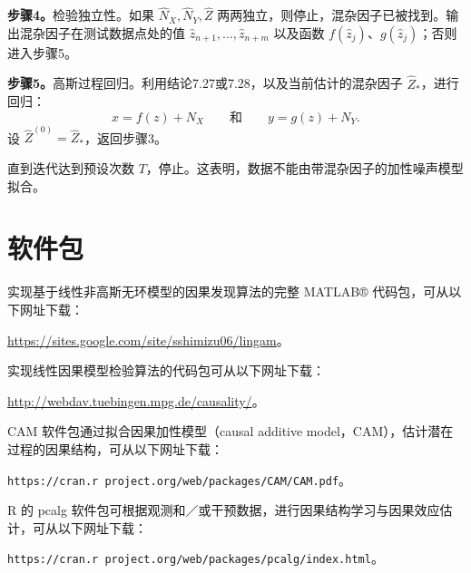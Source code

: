\noindent\textbf{步骤4。}检验独立性。如果 $\widehat N_X,\widehat N_Y,\widehat Z$ 两两独立，则停止，混杂因子已被找到。输出混杂因子在测试数据点处的值 $\widehat z_{n+1},\ldots,\widehat z_{n+m}$ 以及函数 $f(\widehat z_j)$、$g(\widehat z_j)$；否则进入步骤5。

\noindent\textbf{步骤5。}高斯过程回归。利用结论7.27或7.28，以及当前估计的混杂因子 $\widehat Z_*$，进行回归：
\[
x=f(z)+N_X\qquad\text{和}\qquad y=g(z)+N_Y.
\]
设 $\widehat Z^{(0)}=\widehat Z_*$，返回步骤3。

直到迭代达到预设次数 $T$，停止。这表明，数据不能由带混杂因子的加性噪声模型拟合。

\section*{软件包}

实现基于线性非高斯无环模型的因果发现算法的完整 MATLAB® 代码包，可从以下网址下载：
\par\noindent\url{https://sites.google.com/site/sshimizu06/lingam}。

实现线性因果模型检验算法的代码包可从以下网址下载：
\par\noindent\url{http://webdav.tuebingen.mpg.de/causality/}。

CAM 软件包通过拟合因果加性模型（causal additive model，CAM），估计潜在过程的因果结构，可从以下网址下载：
\par\noindent\texttt{https://cran.r project.org/web/packages/CAM/CAM.pdf}。

R 的 pcalg 软件包可根据观测和／或干预数据，进行因果结构学习与因果效应估计，可从以下网址下载：
\par\noindent\texttt{https://cran.r project.org/web/packages/pcalg/index.html}。
